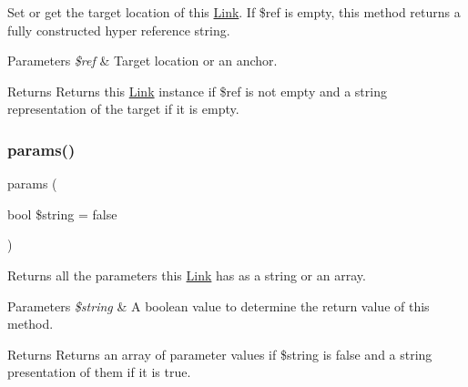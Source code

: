 Set or get the target location of this \hyperlink{class_html_1_1_link}{Link}. If \$ref is empty, this method returns a fully constructed hyper reference string. 
\begin{DoxyParams}{Parameters}
{\em \$ref} & Target location or an anchor. \\
\hline
\end{DoxyParams}
\begin{DoxyReturn}{Returns}
Returns this \hyperlink{class_html_1_1_link}{Link} instance if \$ref is not empty and a string representation of the target if it is empty. 
\end{DoxyReturn}

\mbox{\label{class_html_1_1_link_a781949bb79e8bfc4148fcc40c6b9fb3b}} 
\subsubsection{\texorpdfstring{params()}{params()}}
{\footnotesize\ttfamily params (\begin{DoxyParamCaption}\item[{bool}]{\$string = {\ttfamily false} }\end{DoxyParamCaption})}

Returns all the parameters this \hyperlink{class_html_1_1_link}{Link} has as a string or an array. 
\begin{DoxyParams}{Parameters}
{\em \$string} & A boolean value to determine the return value of this method. \\
\hline
\end{DoxyParams}
\begin{DoxyReturn}{Returns}
Returns an array of parameter values if \$string is false and a string presentation of them if it is true. 
\end{DoxyReturn}

